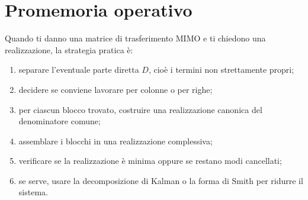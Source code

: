 \bigskip

\section*{Promemoria operativo}

Quando ti danno una matrice di trasferimento MIMO e ti chiedono una realizzazione, la strategia pratica è:

\begin{enumerate}
    \item separare l'eventuale parte diretta \(D\), cioè i termini non strettamente propri;
    \item decidere se conviene lavorare per colonne o per righe;
    \item per ciascun blocco trovato, costruire una realizzazione canonica del denominatore comune;
    \item assemblare i blocchi in una realizzazione complessiva;
    \item verificare se la realizzazione è minima oppure se restano modi cancellati;
    \item se serve, usare la decomposizione di Kalman o la forma di Smith per ridurre il sistema.
\end{enumerate}